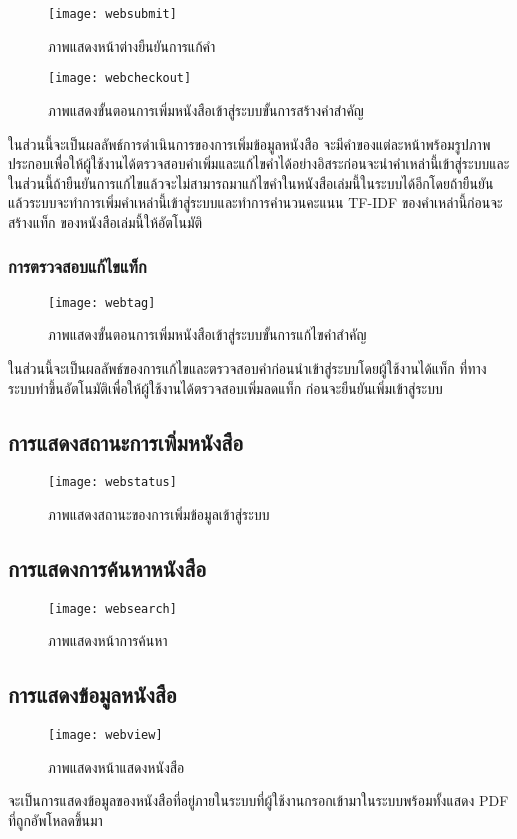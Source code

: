 \begin{figure}[H]
    \centering
    \texttt{[image: websubmit]}
    \caption{ภาพแสดงหน้าต่างยืนยันการแก้คำ}\label{fig:websubmit}
\end{figure}

\begin{figure}[H]
    \centering
    \texttt{[image: webcheckout]}
    \caption{ภาพแสดงขั้นตอนการเพิ่มหนังสือเข้าสู่ระบบขั้นการสร้างคำสำคัญ}\label{fig:webcheckout}
\end{figure}
ในส่วนนี้จะเป็นผลลัพธ์การดำเนินการของการเพิ่มข้อมูลหนังสือ จะมีคำของแต่ละหน้าพร้อมรูปภาพประกอบเพื่อให้ผู้ใช้งานได้ตรวจสอบคำเพิ่มและแก้ไขคำได้อย่างอิสระก่อนจะนำคำเหล่านี้เข้าสู่ระบบและในส่วนนี้ถ้ายืนยันการแก้ไขแล้วจะไม่สามารถมาแก้ไขคำในหนังสือเล่มนี้ในระบบได้อีกโดยถ้ายืนยันแล้วระบบจะทำการเพิ่มคำเหล่านี้เข้าสู่ระบบและทำการคำนวนคะแนน TF-IDF ของคำเหล่านี้ก่อนจะสร้างแท็ก ของหนังสือเล่มนี้ให้อัตโนมัติ

\subsubsection{การตรวจสอบแก้ไขแท็ก}
\begin{figure}[H]
    \centering
    \texttt{[image: webtag]}
    \caption{ภาพแสดงขั้นตอนการเพิ่มหนังสือเข้าสู่ระบบขั้นการแก้ไขคำสำคัญ}\label{fig:webtag}
\end{figure}
ในส่วนนี้จะเป็นผลลัพธ์ของการแก้ไขและตรวจสอบคำก่อนนำเข้าสู่ระบบโดยผู้ใช้งานได้แท็ก ที่ทางระบบทำขึ้นอัตโนมัติเพื่อให้ผู้ใช้งานได้ตรวจสอบเพิ่มลดแท็ก ก่อนจะยืนยันเพิ่มเข้าสู่ระบบ
\subsection{การแสดงสถานะการเพิ่มหนังสือ}
\begin{figure}[H]
    \centering
    \texttt{[image: webstatus]}
    \caption{ภาพแสดงสถานะของการเพิ่มข้อมูลเข้าสู่ระบบ}\label{fig:webstatus}
\end{figure}

\subsection{การแสดงการค้นหาหนังสือ}
\begin{figure}[H]
    \centering
    \texttt{[image: websearch]}
    \caption{ภาพแสดงหน้าการค้นหา}\label{fig:websearch}
\end{figure}

\subsection{การแสดงข้อมูลหนังสือ}
\begin{figure}[H]
    \centering
    \texttt{[image: webview]}
    \caption{ภาพแสดงหน้าแสดงหนังสือ}\label{fig:webview}
\end{figure}
จะเป็นการแสดงข้อมูลของหนังสือที่อยู่ภายในระบบที่ผู้ใช้งานกรอกเข้ามาในระบบพร้อมทั้งแสดง PDF ที่ถูกอัพโหลดขึ้นมา

